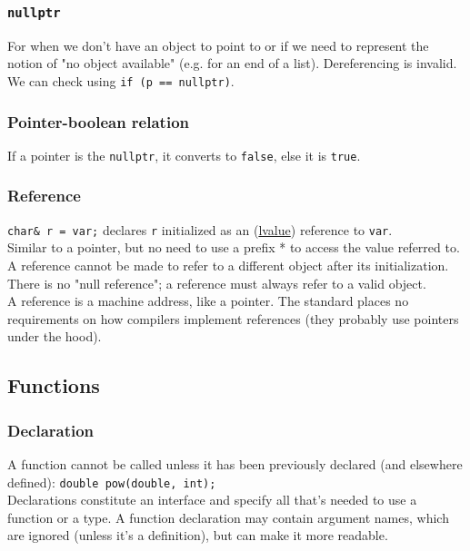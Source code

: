 \documentclass[8pt, table, xcdraw]{article}%
\begin{document}
\subsubsection{\lstinline{nullptr}}
For when we don't have an object to point to or if we need to represent the notion of "no object available" (e.g. for an end of a list). Dereferencing is invalid. We can check using \lstinline{if (p == nullptr)}.

\subsubsection{Pointer-boolean relation}
If a pointer is the \lstinline{nullptr}, it converts to \lstinline{false}, else it is \lstinline{true}.

\subsubsection{Reference} \label{reference}
\lstinline{char& r = var;} declares \lstinline{r} initialized as an (\hyperref[lvalue]{lvalue}) reference to \lstinline{var}.\\
Similar  to  a  pointer, but no need to use a prefix * to access the value referred to.\\
A reference cannot be made to refer to a different object after its initialization.\\
There  is  no  "null  reference"; a reference must always refer to a valid object.\\
A reference is a machine address, like a pointer. The standard places no requirements on how compilers implement references (they probably use pointers under the hood).

\subsection{Functions}

\subsubsection{Declaration}
A function cannot be called unless it has been previously declared (and elsewhere defined): \lstinline{double pow(double, int);}\\
Declarations constitute an interface and specify all that's needed to use a  function or a type. A function declaration may contain argument names, which are ignored (unless it's a definition), but can make it more readable.
\end{document}
